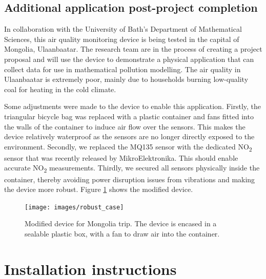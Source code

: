 \documentclass[11pt]{report}
\begin{document}
\section{Additional application post-project completion}

In collaboration with the University of Bath's Department of Mathematical Sciences, this air quality monitoring device is being tested in the capital of Mongolia, Ulaanbaatar. The research team are in the process of creating a project proposal and will use the device to demonstrate a physical application that can collect data for use in mathematical pollution modelling. The air quality in Ulaanbaatar is extremely poor, mainly due to households burning low-quality coal for heating in the cold climate.

Some adjustments were made to the device to enable this application. Firstly, the triangular bicycle bag was replaced with a plastic container and fans fitted into the walls of the container to induce air flow over the sensors. This makes the device relatively waterproof as the sensors are no longer directly exposed to the environment. Secondly, we replaced the MQ135 sensor with the dedicated NO\textsubscript{2} sensor that was recently released by MikroElektronika. This should enable accurate NO\textsubscript{2} measurements. Thirdly, we secured all sensors physically inside the container, thereby avoiding power disruption issues from vibrations and making the device more robust. Figure \ref{fig:modified_device} shows the modified device.

\begin{figure}[!tb]
\centering
\texttt{[image: images/robust\_case]}
\caption[Modified device for Mongolia trip.]{Modified device for Mongolia trip. The device is encased in a sealable plastic box, with a fan to draw air into the container.}
\label{fig:modified_device}
\end{figure}



\clearpage
\newpage
{}


\pagebreak

\appendix

\chapter{Installation instructions}
\end{document}
